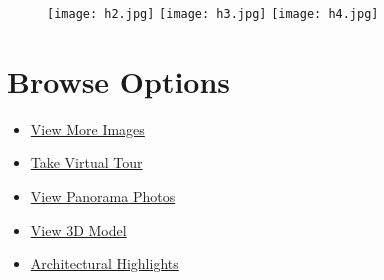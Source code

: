 \documentclass[10pt,letterpaper,twocolumn,landscape]{article}
\newcommand{\browseHref}[2]{\href{#1}{\Large #2}}
\newenvironment{cframed}{\begin{mdframed}[linecolor=logoPeach,linewidth=0.4mm]}{\end{mdframed}}
\begin{document}
\begin{cframed}

\hspace{-.195\textwidth}
\begin{minipage}{1.3\textwidth}
\begin{figure}[H]
\begin{center}
\texttt{[image: h2.jpg]}
\texttt{[image: h3.jpg]}
\texttt{[image: h4.jpg]}
\end{center}
\end{figure}
\end{minipage}


\section*{Browse Options}
\begin{itemize}
\item\browseHref{http://www.njmls.com/listings/index.cfm?action=dsp.info&mlsnum=1810325&openhouse=true&dayssince=15&countysearch=false}{View More Images}
\item\browseHref{http://www.njmls.com/listings/index.cfm?action=dsp.info&mlsnum=1810325&openhouse=true&dayssince=15&countysearch=false}{Take Virtual Tour}
\item\browseHref{http://www.njmls.com/listings/index.cfm?action=dsp.info&mlsnum=1810325&openhouse=true&dayssince=15&countysearch=false}{View Panorama Photos}
\item\browseHref{http://www.njmls.com/listings/index.cfm?action=dsp.info&mlsnum=1810325&openhouse=true&dayssince=15&countysearch=false}{View 3D Model}
\item\browseHref{http://www.njmls.com/listings/index.cfm?action=dsp.info&mlsnum=1810325&openhouse=true&dayssince=15&countysearch=false}{Architectural Highlights}

\end{itemize}


\end{cframed}
\end{document}
